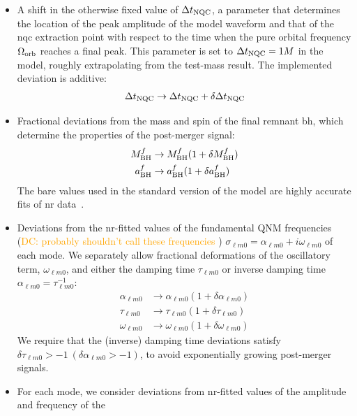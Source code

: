 \documentclass[prd,amssymb,amsmath,amsfonts,nofootinbib,reprint,showpacs,longbibliography]{revtex4-1}
\def\mbhf{M_{\rm BH}^f}
\def\abhf{a_{\rm BH}^f}
\def\alphalm0{\alpha_{\ell m 0}}
\def\taulm0{\tau_{\ell m 0}}
\def\omegalm0{\omega_{\ell m 0}}
\newcommand{\DC}[1]{{\textcolor{orange}{{DC: #1}} }}
\begin{document}
\begin{itemize}
    \item A shift in the otherwise fixed value of $\Delta t_{\rm NQC}$, a parameter that determines the location
    of the peak amplitude of the model waveform and that of the \ac{nqc} extraction point with respect to the
    time when the pure orbital frequency $\Omega_{\rm orb}$ reaches a final peak. This parameter is set
    to $\Delta t_{\rm NQC} = 1M$ in the model, roughly extrapolating from the test-mass result. The implemented
    deviation is additive:
    \begin{equation}
    \Delta t_{\rm NQC} \rightarrow \Delta t_{\rm NQC} + \delta \Delta t_{\rm NQC}
    \end{equation}
    \item Fractional deviations from the mass and spin of the final remnant \ac{bh}, which determine the properties
    of the post-merger signal:
    \begin{subequations}
    \begin{align}
    \mbhf &\rightarrow \mbhf (1 + \delta \mbhf) \\
    \abhf &\rightarrow \abhf (1 + \delta \abhf)
    \end{align}
    \end{subequations}
    The bare values used in the standard version of the model are highly accurate fits of \ac{nr} data~\cite{paper}.
%
\item Deviations from the \ac{nr}-fitted values of the fundamental QNM frequencies (\DC{probably shouldn't call these frequencies})
$\sigma_{\ell m 0} = \alphalm0 + i \omegalm0$ of each mode. We separately allow fractional deformations of the oscillatory
term, $\omegalm0$, and either the damping time $\taulm0$ or inverse damping time $\alphalm0 = \taulm0^{-1}$:
\begin{subequations}
\begin{align}
\alphalm0 &\rightarrow \alphalm0 (1 + \delta \alphalm0) \\
\taulm0   &\rightarrow \taulm0   (1 + \delta \taulm0) \\
\omegalm0 &\rightarrow \omegalm0 (1 + \delta \omegalm0)
\end{align}
\end{subequations}
We require that the (inverse) damping time deviations satisfy $\delta \taulm0 > -1\  (\delta \alphalm0 > -1)$, to avoid exponentially growing
post-merger signals.
%
\item For each mode, we consider deviations from \ac{nr}-fitted values of the amplitude and frequency of the

\end{itemize}
\end{document}
